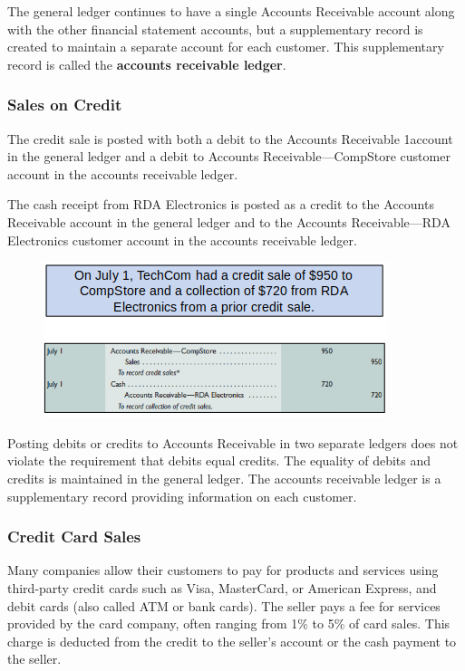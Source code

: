 \documentclass[../main.tex]{subfiles}
\begin{document}
	The general ledger continues to have a single Accounts 
	Receivable account along with the other financial statement accounts, but a 
	supplementary record is created to maintain a separate account for each 
	customer. This supplementary record is called the \textbf{accounts 
	receivable 
	ledger}.
	
	\subsubsection{Sales on Credit}

	The credit sale is posted with both a debit to the Accounts Receivable 
	1account in the general ledger and a debit to Accounts Receivable—CompStore 
	customer account in the accounts receivable ledger. 

	The cash receipt from RDA Electronics is posted as a credit to the Accounts 
	Receivable account in the general ledger and to the Accounts Receivable—RDA 
	Electronics customer account in the accounts receivable ledger. 
	
	\begin{figure}[ht]
		\centering
		\includegraphics[width=\columnwidth]{images/c6/sales_on_credit_eg.png}
	\end{figure}

	Posting debits or credits to Accounts Receivable in two separate ledgers 
	does not violate the requirement that debits equal credits. The equality of 
	debits and credits is maintained in the general ledger. The accounts 
	receivable ledger is a supplementary record providing information on each 
	customer.
	
	\subsubsection{Credit Card Sales}
	
	Many companies allow their customers to pay for products and services using 
	third-party credit cards such as Visa, MasterCard, or American Express, and 
	debit cards (also called ATM or bank cards). The seller pays a fee for 
	services provided by the card company, often ranging from 1\% to 5\% of 
	card sales. This charge is deducted from the credit to the seller’s account 
	or the cash payment to the seller.
	
\end{document}
